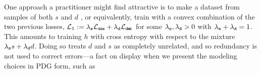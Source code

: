 \documentclass[twoside]{article}
\makeatletter
\theoremstyle{plain}
\theoremstyle{definition}
\DeclareMathOperator*{\Ex}{\mathbb{E}} %
\newcommand{\dg}[1]{\mathbdcal{#1}}
\newcommand\aar{\@ifstar\aar@one@star\aar@plain}
\newcommand\aar@one@star{\@ifstar\aar@resize{\aar@plain*}}
\newcommand\aar@resize[1]{\sbox{\aar@content}{#1}\scaleleftright[3.8ex]
			{\Biggl\langle\!\!\!\!\Biggl\langle}{\usebox{\aar@content}}
			{\Biggr\rangle\!\!\!\!\Biggr\rangle}}
\makeatother
\begin{document}
One approach a practitioner might find attractive is to make a dataset from samples of both $s$ and $d$%
, or equivalently, train with a convex combination
of the two previous losses,
$\mathcal L_1 := \lambda_{\texttt{s}}\mathcal L_{\texttt{s\kern-1.1pti\kern-0.8ptm}} + \lambda_{\texttt{d}}\mathcal L_{\texttt{d\kern-0.75pta\kern-1ptt}}$
for some $\lambda_{\texttt{s}}, \lambda_{\texttt{d}} > 0$ with $\lambda_{\texttt{s}} + \lambda_{\texttt{d}} = 1$.
This amounts to training $h$ with cross entropy with respect to the mixture
$\lambda_{\texttt{s}} s + \lambda_{\texttt{d}} d$.
Doing so treats $d$ and $s$ as completely unrelated, and so redundancy is not used to correct errors---a fact on display when we present the modeling choices in PDG form,
such as
\vspace{-1ex}
\end{document}
